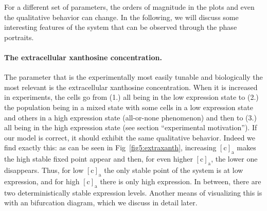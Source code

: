 \documentclass[10pt,letterpaper]{article}
\newcommand{\n}[1]{\mathrm{#1}}
\begin{document}
	For a different set of parameters, the orders of magnitude in the plots and
	even the qualitative behavior can change. In the following, we will discuss
	some interesting features of the system that can be observed through the
	phase portraits. 
	
	\paragraph*{The extracellular xanthosine concentration.}
	The parameter that is the experimentally most easily tunable and
	biologically the most relevant is the extracellular xanthosine
	concentration. When it is increased in experiments, the cells go from (1.) all
	being in the low expression state to (2.) the population being in a mixed state with some cells in a low expression state and others in a high expression state (all-or-none phenomenon) and then to (3.) all being in the high
	expression state (see section ``experimental motivation''). If our model is correct, it should
	exhibit the same qualitative behavior. Indeed we find exactly this: as can
	be seen in Fig~\ref{fig5:extraxanth}, increasing $\n{[c]_a}$ makes the high
	stable fixed point appear and then, for even higher $\n{[c]_a}$, the lower
	one disappears. Thus, for low $\n{[c]_a}$ the only stable point of the system
	is at low expression, and for high $\n{[c]_a}$ there is only high
	expression. In between, there are two deterministically stable expression
	levels. Another means of visualizing this is with an bifurcation diagram, which we discuss in detail later.
	
\end{document}
